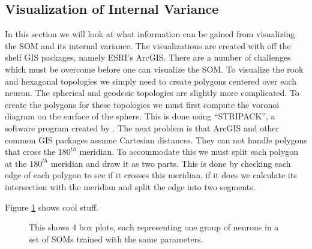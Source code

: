 \subsection{Visualization of Internal Variance}
In this section we will look at what information can be gained from
visualizing the SOM and its internal variance. The visualizations are created
with off the shelf GIS packages, namely ESRI's ArcGIS.  There are a number of
challenges which must be overcome before one can visualize the SOM.  To
visualize the rook and hexagonal topologies we simply need to create polygons
centered over each neuron.  The spherical and geodesic topologies are slightly
more complicated.  To create the polygons for these topologies we must first
compute the voronoi diagram on the surface of the sphere.  This is done using
``STRIPACK'', a software program created by \cite{Ranka97}.  The next problem
is that ArcGIS and other common GIS packages assume Cartesian distances.  They
can not handle polygons that cross the $180^{th}$ meridian.  To accommodate this we
must split each polygon at the $180^{th}$ meridian and draw it as two parts.  This
is done by checking each edge of each polygon to see if it crosses this
meridian, if it does we calculate its intersection with the meridian and split
the edge into two segments.

        Figure \ref{ten} shows cool stuff.






\begin{figure}[hbt]
\centering
{}
\caption{This shows 4 box plots, each representing one group of neurons in a set
of SOMs trained with the same parameters.}
\label{ten}
\end{figure}
